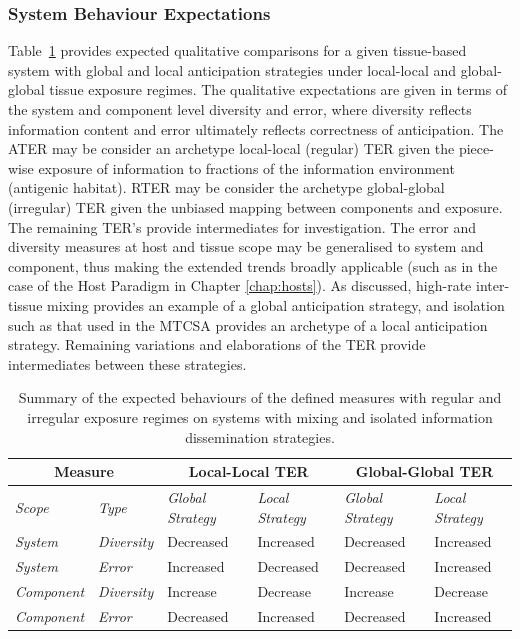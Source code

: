 %
%
\subsubsection{System Behaviour Expectations}
Table~\ref{tab:tissue:measures:expected:behaviour} provides expected qualitative comparisons for a given tissue-based system with global and local anticipation strategies under local-local and global-global tissue exposure regimes. The qualitative expectations are given in terms of the system and component level diversity and error, where diversity reflects information content and error ultimately reflects correctness of anticipation.
The ATER may be consider an archetype local-local (regular) TER given the piece-wise exposure of information to fractions of the information environment (antigenic habitat). RTER may be consider the archetype global-global (irregular) TER given the unbiased mapping between components and exposure. The remaining TER's provide intermediates for investigation.
The error and diversity measures at host and tissue scope may be generalised to system and component, thus making the extended trends broadly applicable (such as in the case of the Host Paradigm in Chapter \ref{chap:hosts}).
As discussed, high-rate inter-tissue mixing provides an example of a global anticipation strategy, and isolation such as that used in the MTCSA provides an archetype of a local anticipation strategy. Remaining variations and elaborations of the TER provide intermediates between these strategies.

\begin{table}[ht]
	\centering\small
		\begin{tabular}{llllll}
		\toprule
		\multicolumn{2}{c}{Measure} & \multicolumn{2}{c}{Local-Local TER} & \multicolumn{2}{c}{Global-Global TER} \\ 
		\toprule
		\emph{Scope} & \emph{Type} & \emph{Global Strategy} & \emph{Local Strategy} & \emph{Global Strategy} & \emph{Local Strategy} \\ 
		\toprule		
		\emph{System} & \emph{Diversity} 	  & Decreased & Increased & Decreased & Increased \\ 
		\emph{System} & \emph{Error} 			  & Increased & Decreased & Decreased & Increased \\ 		
		\emph{Component} & \emph{Diversity} & Increase & Decrease & Increase & Decrease \\ 
		\emph{Component} & \emph{Error}  	  & Decreased & Increased & Decreased & Increased \\ 
		\bottomrule
		\end{tabular}
	\caption{Summary of the expected behaviours of the defined measures with regular and irregular exposure regimes on systems with mixing and isolated information dissemination strategies.}
	\label{tab:tissue:measures:expected:behaviour}
\end{table}

